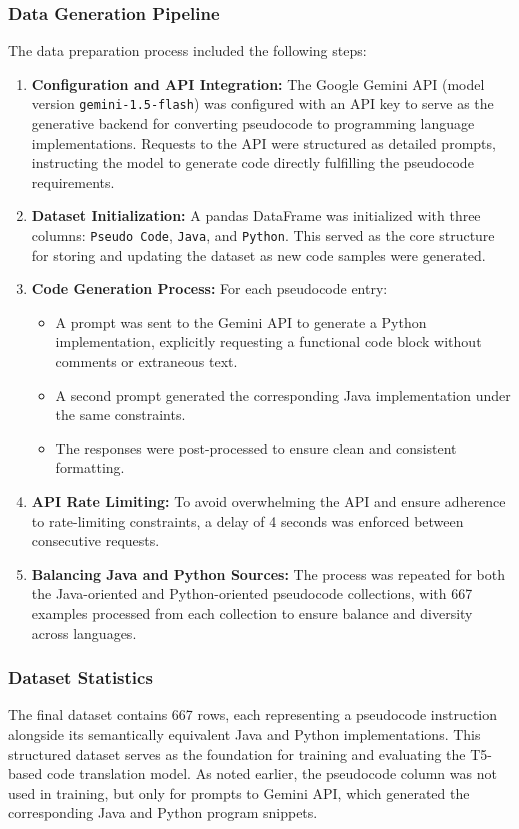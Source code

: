 \documentclass{dhbenelux}
\begin{document}
\subsubsection{Data Generation Pipeline}
The data preparation process included the following steps:
\begin{enumerate}
  \item \textbf{Configuration and API Integration:} The Google Gemini API (model version \texttt{gemini-1.5-flash}) was configured with an API key to serve as the generative backend for converting pseudocode to programming language implementations. Requests to the API were structured as detailed prompts, instructing the model to generate code directly fulfilling the pseudocode requirements.
  \item \textbf{Dataset Initialization:} A pandas DataFrame was initialized with three columns: \texttt{Pseudo Code}, \texttt{Java}, and \texttt{Python}. This served as the core structure for storing and updating the dataset as new code samples were generated.
  \item \textbf{Code Generation Process:} For each pseudocode entry:
    \begin{itemize}
        \item A prompt was sent to the Gemini API to generate a Python implementation, explicitly requesting a functional code block without comments or extraneous text.
        \item A second prompt generated the corresponding Java implementation under the same constraints.
        \item The responses were post-processed to ensure clean and consistent formatting.
    \end{itemize}
  \item \textbf{API Rate Limiting:} To avoid overwhelming the API and ensure adherence to rate-limiting constraints, a delay of 4 seconds was enforced between consecutive requests.
  \item \textbf{Balancing Java and Python Sources:} The process was repeated for both the Java-oriented and Python-oriented pseudocode collections, with 667 examples processed from each collection to ensure balance and diversity across languages.
\end{enumerate}



\subsubsection{Dataset Statistics} The final dataset contains 667 rows, each representing a pseudocode instruction alongside its semantically equivalent Java and Python implementations. This structured dataset serves as the foundation for training and evaluating the T5-based code translation model. As noted earlier, the pseudocode column was not used in training, but only for prompts to Gemini API, which generated the corresponding Java and Python program snippets.
\end{document}
